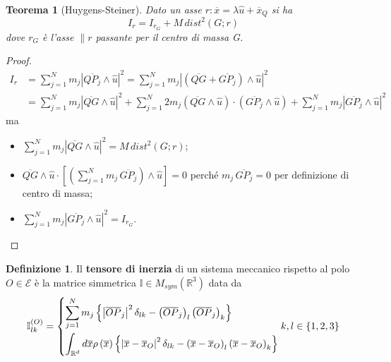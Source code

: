 \documentclass{book}
\theoremstyle{plain}
\newtheorem{teo}{Teorema}[chapter]
\theoremstyle{plain}
\theoremstyle{plain}
\theoremstyle{plain}
\theoremstyle{plain}
\theoremstyle{definition}
\newtheorem{defi}{Definizione}[chapter]
\theoremstyle{remark}
\theoremstyle{definition}
\begin{document}
\begin{teo}[Huygens-Steiner]
    Dato un asse $r: \overline{x}=\lambda \hat{u} + \overline{x}_Q$ si ha
    \begin{displaymath}
        \boxed{
        I_r=I_{r_G} + M\,dist^2(G;r)
        }
    \end{displaymath}
    dove $r_G$ è l'asse $\parallel r$ passante per il centro di massa G.
\end{teo}

\begin{proof}
    \[
    \begin{split}
        I_r&=\sum_{j=1}^Nm_j\left|\overline{QP_j}\wedge\hat{u}\right|^2=\sum_{j=1}^Nm_j\left|(\overline{QG}+\overline{GP_j})\wedge\hat{u}\right|^2 \\
        &=\sum_{j=1}^Nm_j\left|\overline{QG}\wedge\hat{u}\right|^2+\sum_{j=1}^N2m_j\left(\overline{QG}\wedge\hat{u}\right)\cdot\left(\overline{GP_j}\wedge\hat{u}\right)+\sum_{j=1}^Nm_j\left|\overline{GP_j}\wedge\hat{u}\right|^2
    \end{split}
    \]
    ma
    \begin{itemize}
        \item $\sum_{j=1}^Nm_j\left|\overline{QG}\wedge\hat{u}\right|^2=M\,dist^2(G;r)$;
        \item $\overline{QG}\wedge\hat{u}\cdot\left[\left(\sum_{j=1}^Nm_j\,\overline{GP_j}\right)\wedge\hat{u}\right]=0$ perché $m_j\,\overline{GP_j}=0$ per definizione di centro di massa;
        \item $\sum_{j=1}^Nm_j\left|\overline{GP_j}\wedge\hat{u}\right|^2=I_{r_G}$.
    \end{itemize}
\end{proof}

\begin{defi}
    Il \textbf{tensore di inerzia} di un sistema meccanico rispetto al polo $O \in \mathcal{E}$ è la matrice simmetrica $\mathbb{I} \in M_{sym}(\mathbb{R}^3)$ data da
    \begin{displaymath}
        \mathbb{I}_{lk}^{(O)}=
        \begin{dcases}
            \sum_{j=1}^N m_j\left\{\left|\overline{OP}_j\right|^2 \delta_{lk} - \left(\overline{OP}_j\right)_l\left(\overline{OP}_j\right)_k\right\} \\
            \int_{\mathbb{R}^d} d\overline{x} \rho \left(\overline{x}\right) \left\{\left |\overline{x}-\overline{x}_O\right|^2\delta_{lk} - \left(\overline{x}-\overline{x}_O\right)_l\left(\overline{x}-\overline{x}_O\right)_k\right\}
        \end{dcases}
        k,l \in \{1, 2, 3\}
    \end{displaymath}
\end{defi}
\end{document}
